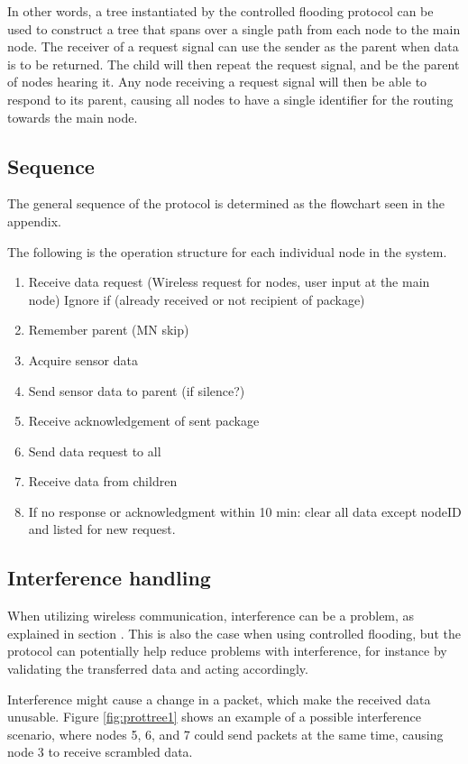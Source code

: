In other words, a tree instantiated by the controlled flooding protocol can be used to construct a tree that spans over a single path from each node to the main node.
The receiver of a request signal can use the sender as the parent when data is to be returned.
The child will then repeat the request signal, and be the parent of nodes hearing it.
Any node receiving a request signal will then be able to respond to its parent, causing all nodes to have a single identifier for the routing towards the main node.

\subsection{Sequence}
The general sequence of the protocol is determined as the flowchart seen in the appendix.

The following is the operation structure for each individual node in the system.
\begin{enumerate}
	\item Receive data request (Wireless request for nodes, user input at the main node)
	\subitem Ignore if (already received or not recipient of package)
	\item Remember parent (MN skip)
	\item Acquire sensor data
	\item Send sensor data to parent (if silence?)
	\item Receive acknowledgement of sent package
	\item Send data request to all
	\item Receive data from children
	\item If no response or acknowledgment within 10 min: clear all data except nodeID and listed for new request.
\end{enumerate}

\subsection{Interference handling} \label{cha:crcDesign}
When utilizing wireless communication, interference can be a problem, as explained in section . This is also the case when using controlled flooding, but the protocol can potentially help reduce problems with interference, for instance by validating the transferred data and acting accordingly.

Interference might cause a change in a packet, which make the received data unusable. Figure \ref{fig:prottree1} shows an example of a possible interference scenario, where nodes 5, 6, and 7 could send packets at the same time, causing node 3 to receive scrambled data.

